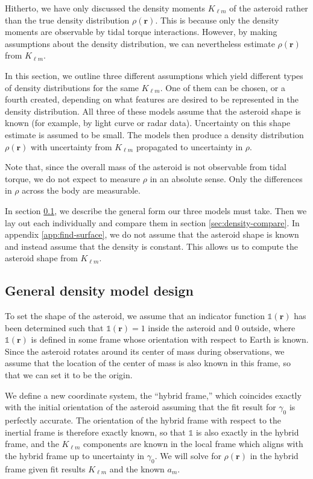 \documentclass[fleqn,usenatbib]{mnras}
\begin{document}
Hitherto, we have only discussed the density moments $K_{\ell m}$ of the asteroid rather than the true density distribution $\rho(\bm r)$. This is because only the density moments are observable by tidal torque interactions. However, by making assumptions about the density distribution, we can nevertheless estimate $\rho(\bm r)$ from $K_{\ell m}$.

In this section, we outline three different assumptions which yield different types of density distributions for the same $K_{\ell m}$. One of them can be chosen, or a fourth created, depending on what features are desired to be represented in the density distribution. All three of these models assume that the asteroid shape is known (for example, by light curve or radar data). Uncertainty on this shape estimate is assumed to be small. The models then produce a density distribution $\rho(\bm r)$ with uncertainty from $K_{\ell m}$ propagated to uncertainty in $\rho$.

Note that, since the overall mass of the asteroid is not observable from tidal torque, we do not expect to measure $\rho$ in an absolute sense. Only the differences in $\rho$ across the body are measurable.

In section \ref{sec:general-density}, we describe the general form our three models must take. Then we lay out each individually and compare them in section \ref{sec:density-compare}. In appendix \ref{app:find-surface}, we do not assume that the asteroid shape is known and instead assume that the density is constant. This allows us to compute the asteroid shape from $K_{\ell m}$.


\subsection{General density model design}
\label{sec:general-density}

To set the shape of the asteroid, we assume that an indicator function $\mathds{1}(\bm r)$ has been determined such that $\mathds{1}(\bm r) = 1$ inside the asteroid and 0 outside, where $\mathds{1}(\bm r)$ is defined in some frame whose orientation with respect to Earth is known. Since the asteroid rotates around its center of mass during observations, we assume that the location of the center of mass is also known in this frame, so that we can set it to be the origin.

We define a new coordinate system, the ``hybrid frame,'' which coincides exactly with the initial orientation of the asteroid assuming that the fit result for $\gamma_0$ is perfectly accurate. The orientation of the hybrid frame with respect to the inertial frame is therefore exactly known, so that $\mathds{1}$ is also exactly in the hybrid frame, and the $K_{\ell m}$ components are known in the local frame which aligns with the hybrid frame up to uncertainty in $\gamma_0$. We will solve for $\rho(\bm r)$ in the hybrid frame given fit results $K_{\ell m}$ and the known $a_m$.
\end{document}
